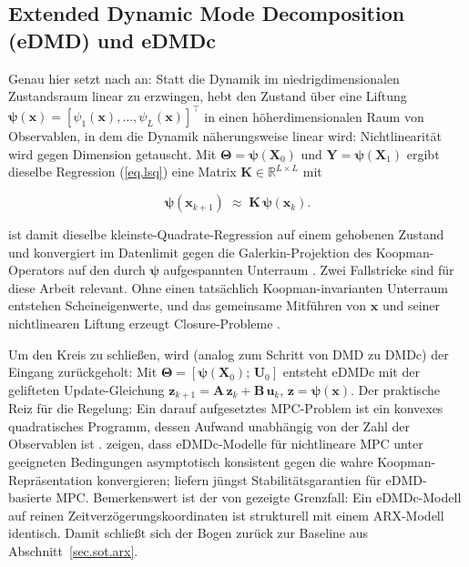 \subsection{Extended Dynamic Mode Decomposition (eDMD) und eDMDc}
\label{ssec.sot.edmd.def}

Genau hier setzt \edmd{} nach \cite{williamsDataDrivenApproximation2015}
an: Statt die Dynamik im niedrigdimensionalen Zustandsraum linear zu
erzwingen, hebt \edmd{} den Zustand über eine Liftung
$\boldsymbol\psi(\mathbf x) = [\psi_1(\mathbf x),\dots,\psi_L(\mathbf x)]^\top$
in einen höherdimensionalen Raum von Observablen, in dem die Dynamik
näherungsweise linear wird: Nichtlinearität wird gegen Dimension
getauscht. Mit $\boldsymbol\Theta = \boldsymbol\psi(\mathbf X_0)$
und $\mathbf Y = \boldsymbol\psi(\mathbf X_1)$ ergibt dieselbe Regression
(\ref{eq.lsq}) eine Matrix
$\mathbf K \in \mathbb R^{L \times L}$ mit

\begin{equation}
  \label{eq.edmd}
  \boldsymbol\psi(\mathbf x_{k+1}) \;\approx\; \mathbf K\, \boldsymbol\psi(\mathbf x_k).
\end{equation}

\edmd{} ist damit dieselbe kleinste-Quadrate-Regression auf einem
gehobenen Zustand und konvergiert im Datenlimit gegen die
Galerkin-Projektion des Koopman-Operators auf den durch
$\boldsymbol\psi$ aufgespannten Unterraum
\cite{williamsDataDrivenApproximation2015, bruntonModernKoopmanTheory2022}.
Zwei Fallstricke sind für diese Arbeit relevant. Ohne einen tatsächlich
Koopman-invarianten Unterraum entstehen Scheineigenwerte, und das
gemeinsame Mitführen von $\mathbf x$ und seiner nichtlinearen Liftung
erzeugt Closure-Probleme
\cite[S.~285--286]{bruntonModernKoopmanTheory2022}.

Um den Kreis zu schließen, wird (analog zum Schritt von DMD zu DMDc)
der Eingang zurückgeholt: Mit
$\boldsymbol\Theta = [\boldsymbol\psi(\mathbf X_0);\,\mathbf U_0]$
entsteht eDMDc mit der gelifteten Update-Gleichung
$\mathbf z_{k+1} = \mathbf A\,\mathbf z_k + \mathbf B\,\mathbf u_k$,
$\mathbf z = \boldsymbol\psi(\mathbf x)$. Der praktische Reiz für die
Regelung: Ein darauf aufgesetztes MPC-Problem ist ein konvexes
quadratisches Programm, dessen Aufwand unabhängig von der Zahl der
Observablen ist \cite[S.~304]{bruntonModernKoopmanTheory2022}.
\cite{kordaLinearPredictorsNonlinear2018} zeigen, dass eDMDc-Modelle für
nichtlineare MPC unter geeigneten Bedingungen asymptotisch konsistent
gegen die wahre Koopman-Repräsentation konvergieren;
\cite{boldDataDrivenMPCStability2025} liefern jüngst
Stabilitätsgarantien für eDMD-basierte MPC. Bemerkenswert ist der von
\cite[S.~305--306]{bruntonModernKoopmanTheory2022} gezeigte
Grenzfall: Ein eDMDc-Modell auf reinen Zeitverzögerungskoordinaten ist
strukturell mit einem ARX-Modell identisch. Damit schließt sich der
Bogen zurück zur Baseline aus Abschnitt~\ref{sec.sot.arx}.





